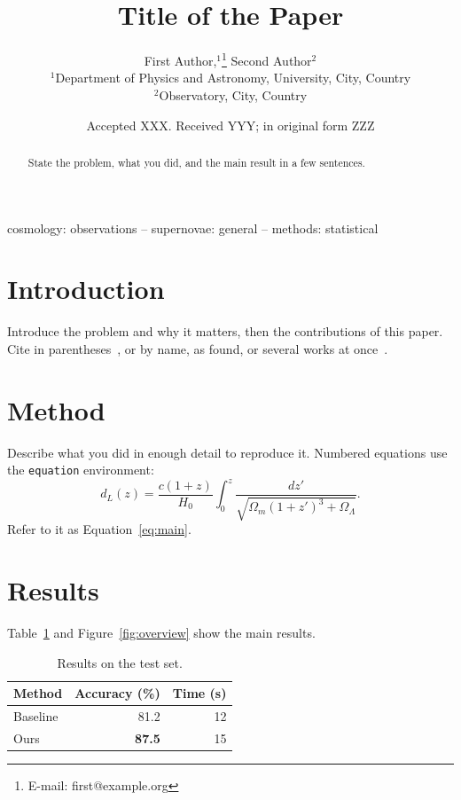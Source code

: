 \documentclass[fleqn,usenatbib]{mnras}
\title[Short title]{Title of the Paper}
\author[F. Author et al.]{
First Author,$^{1}$\thanks{E-mail: first@example.org}
Second Author$^{2}$
\\
$^{1}$Department of Physics and Astronomy, University, City, Country\\
$^{2}$Observatory, City, Country
}
\date{Accepted XXX. Received YYY; in original form ZZZ}
\begin{document}
\label{firstpage}
\pagerange{\pageref{firstpage}--\pageref{lastpage}}
\maketitle

\begin{abstract}
State the problem, what you did, and the main result in a few sentences.
\end{abstract}

\begin{keywords}
cosmology: observations -- supernovae: general -- methods: statistical
\end{keywords}

\section{Introduction}
\label{sec:intro}
Introduce the problem and why it matters, then the contributions of this
paper. Cite in parentheses~\citep{perlmutter1999}, or by name, as \citet{planck2020} found, or several works at
once~\citep{perlmutter1999,riess1998}.

\section{Method}
\label{sec:method}
Describe what you did in enough detail to reproduce it. Numbered equations use
the \texttt{equation} environment:
\begin{equation}
  \label{eq:main}
  d_L(z) = \frac{c (1+z)}{H_0} \int_0^z \frac{dz'}{\sqrt{\Omega_m (1+z')^3 + \Omega_\Lambda}}.
\end{equation}
Refer to it as Equation~\eqref{eq:main}.

\section{Results}
\label{sec:results}
Table~\ref{tab:results} and Figure~\ref{fig:overview} show the main results.

\begin{table}[htbp]
  \centering
  \caption{Results on the test set.}
  \label{tab:results}
  \begin{tabular}{lrr}
    \toprule
    Method & Accuracy (\%) & Time (s) \\
    \midrule
    Baseline & 81.2 & 12 \\
    Ours & \textbf{87.5} & 15 \\
    \bottomrule
  \end{tabular}
\end{table}
\end{document}
